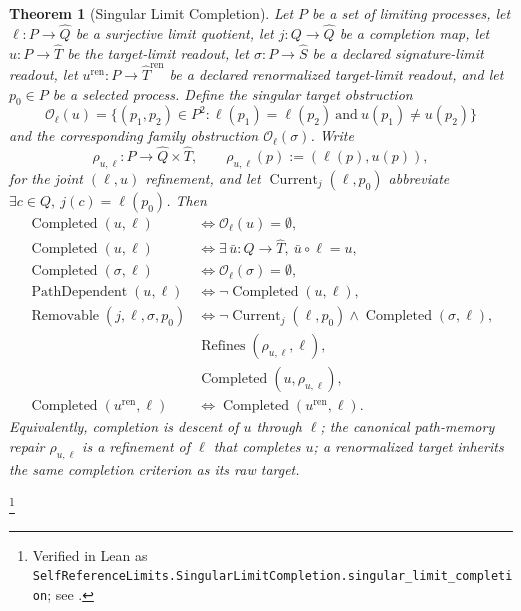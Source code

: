 \documentclass[11pt]{article}
\newtheorem{theorem}{Theorem}[section]
\theoremstyle{definition}
\begin{document}
\begin{theorem}[Singular Limit Completion]\label{thm:F36}
Let \(P\) be a set of limiting processes, let \(\ell:P\to\widehat Q\)
be a surjective limit quotient, let \(j:Q\to\widehat Q\) be a
completion map, let \(u:P\to\widehat T\) be the target-limit readout,
let \(\sigma:P\to\widehat S\) be a declared signature-limit readout,
let \(u^{\mathrm{ren}}:P\to\widehat T^{\mathrm{ren}}\) be a declared
renormalized target-limit readout, and let \(p_0\in P\) be a selected
process.  Define the singular target obstruction
\[
  \mathcal O_{\ell}(u)
  =\{(p_1,p_2)\in P^2:
      \ell(p_1)=\ell(p_2)\ \text{and}\ u(p_1)\ne u(p_2)\}
\]
and the corresponding family obstruction
\(\mathcal O_{\ell}(\sigma)\).  Write
\[
  \rho_{u,\ell}:P\to\widehat Q\times\widehat T,
  \qquad
  \rho_{u,\ell}(p):=(\ell(p),u(p)),
\]
for the joint \((\ell,u)\) refinement, and let
\(\operatorname{Current}_{j}(\ell,p_0)\) abbreviate
\(\exists c\in Q,\ j(c)=\ell(p_0)\).  Then
\begin{align*}
  \operatorname{Completed}(u,\ell)
  &\iff \mathcal O_{\ell}(u)=\emptyset,\\
  \operatorname{Completed}(u,\ell)
  &\iff
  \exists\,\bar u:\widehat Q\to\widehat T,\ \bar u\circ\ell=u,\\
  \operatorname{Completed}(\sigma,\ell)
  &\iff \mathcal O_{\ell}(\sigma)=\emptyset,\\
  \operatorname{PathDependent}(u,\ell)
  &\iff \neg\operatorname{Completed}(u,\ell),\\
  \operatorname{Removable}(j,\ell,\sigma,p_0)
  &\iff
  \neg\operatorname{Current}_{j}(\ell,p_0)
  \wedge
  \operatorname{Completed}(\sigma,\ell),\\
  &\operatorname{Refines}(\rho_{u,\ell},\ell),\\
  &\operatorname{Completed}(u,\rho_{u,\ell}),\\
  \operatorname{Completed}(u^{\mathrm{ren}},\ell)
  &\iff
  \operatorname{Completed}(u^{\mathrm{ren}},\ell).
\end{align*}
Equivalently, completion is descent of \(u\) through \(\ell\); the
canonical path-memory repair \(\rho_{u,\ell}\) is a refinement of
\(\ell\) that completes \(u\); a renormalized target inherits the
same completion criterion as its raw target.
\end{theorem}
\footnote{\raggedright Verified in Lean as
\texttt{SelfReferenceLimits.\allowbreak{}SingularLimitCompletion.\allowbreak{}singular\_limit\_completion};
see .}
\end{document}
